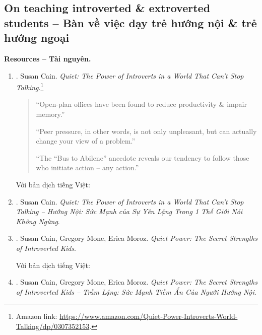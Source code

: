 \documentclass[12pt]{article}
\begin{document}
\subsection{On teaching introverted \& extroverted students -- Bàn về việc dạy trẻ hướng nội \& trẻ hướng ngoại}
\textbf{\textsf{Resources -- Tài nguyên.}}
\begin{enumerate}
	\item \cite{Cain_quiet}. {\sc Susan Cain}. {\it Quiet: The Power of Introverts in a World That Can't Stop Talking}.\footnote{Amazon link: \url{https://www.amazon.com/Quiet-Power-Introverts-World-Talking/dp/0307352153}.}
	\begin{quotation}
		``Open-plan offices have been found to reduce productivity \& impair memory.''
		
		``Peer pressure, in other words, is not only unpleasant, but can actually change your view of a problem.''
		
		``The ``Bus to Abilene'' anecdote reveals our tendency to follow those who initiate action -- any action.''
	\end{quotation}
	Với bản dịch tiếng Việt:
	\item \cite{Cain_quiet_VN}. {\sc Susan Cain}. {\it Quiet: The Power of Introverts in a World That Can't Stop Talking -- Hướng Nội: Sức Mạnh của Sự Yên Lặng Trong 1 Thế Giới Nói Không Ngừng}.
	\item \cite{Cain_Mone_Moroz_quiet_power}. {\sc Susan Cain, Gregory Mone, Erica Moroz}. {\it Quiet Power: The Secret Strengths of Introverted Kids}.
	
	Với bản dịch tiếng Việt:
	\item \cite{Cain_Mone_Moroz_quiet_power_VN}. {\sc Susan Cain, Gregory Mone, Erica Moroz}. {\it Quiet Power: The Secret Strengths of Introverted Kids -- Trầm Lặng: Sức Mạnh Tiềm Ẩn Của Người Hướng Nội}.
\end{enumerate}
\end{document}

